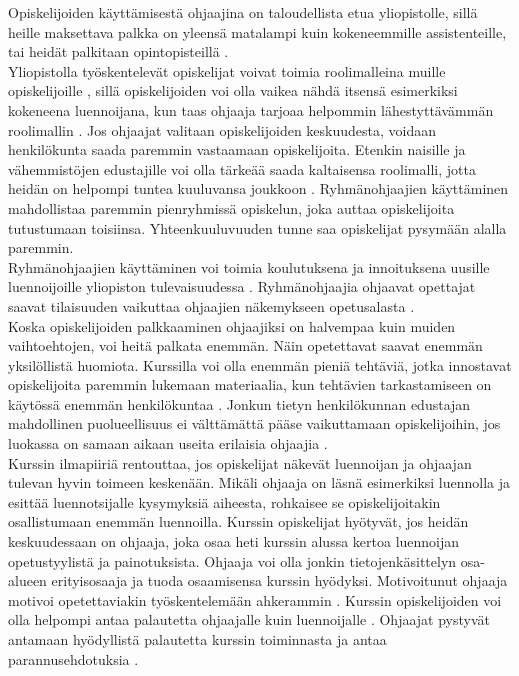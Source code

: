 \documentclass[finnish]{tktltiki2}
\theoremstyle{definition}
\theoremstyle{remark}
\begin{document}
Opiskelijoiden käyttämisestä ohjaajina on taloudellista etua yliopistolle, sillä heille maksettava palkka on yleensä matalampi kuin kokeneemmille assistenteille, tai heidät palkitaan opintopisteillä \cite{Reges88}.
\\
Yliopistolla työskentelevät opiskelijat voivat toimia roolimalleina muille opiskelijoille \cite{Roberts95, Tashakkori05}, sillä opiskelijoiden voi olla vaikea nähdä itsensä esimerkiksi kokeneena luennoijana, kun taas ohjaaja tarjoaa helpommin lähestyttävämmän roolimallin \cite{Roberts02}. Jos ohjaajat valitaan opiskelijoiden keskuudesta, voidaan henkilökunta saada paremmin vastaamaan opiskelijoita. Etenkin naisille ja vähemmistöjen edustajille voi olla tärkeää saada kaltaisensa roolimalli, jotta heidän on helpompi tuntea kuuluvansa joukkoon \cite{Morgan02}. Ryhmänohjaajien käyttäminen mahdollistaa paremmin pienryhmissä opiskelun, joka auttaa opiskelijoita tutustumaan toisiinsa. Yhteenkuuluvuuden tunne saa opiskelijat pysymään alalla paremmin.
\\
Ryhmänohjaajien käyttäminen voi toimia koulutuksena ja innoituksena uusille luennoijoille yliopiston tulevaisuudessa \cite{Roberts95, Morgan02}. Ryhmänohjaajia ohjaavat opettajat saavat tilaisuuden vaikuttaa ohjaajien näkemykseen opetusalasta \cite{Morgan02}.
\\
Koska opiskelijoiden palkkaaminen ohjaajiksi on halvempaa kuin muiden vaihtoehtojen, voi heitä palkata enemmän. Näin opetettavat saavat enemmän yksilöllistä huomiota. Kurssilla voi olla enemmän pieniä tehtäviä, jotka innostavat opiskelijoita paremmin lukemaan materiaalia, kun tehtävien tarkastamiseen on käytössä enemmän henkilökuntaa \cite{Dickson11}. Jonkun tietyn henkilökunnan edustajan mahdollinen puolueellisuus ei välttämättä pääse vaikuttamaan opiskelijoihin, jos luokassa on samaan aikaan useita erilaisia ohjaajia \cite{Morgan02}.
\\
Kurssin ilmapiiriä rentouttaa, jos opiskelijat näkevät luennoijan ja ohjaajan tulevan hyvin toimeen keskenään. Mikäli ohjaaja on läsnä esimerkiksi luennolla ja esittää luennotsijalle kysymyksiä aiheesta, rohkaisee se opiskelijoitakin osallistumaan enemmän luennoilla. Kurssin opiskelijat hyötyvät, jos heidän keskuudessaan on ohjaaja, joka osaa heti kurssin alussa kertoa luennoijan opetustyylistä ja painotuksista. Ohjaaja voi olla jonkin tietojenkäsittelyn osa-alueen erityisosaaja ja tuoda osaamisensa kurssin hyödyksi. Motivoitunut ohjaaja motivoi opetettaviakin työskentelemään ahkerammin \cite{Dickson11}. Kurssin opiskelijoiden voi olla helpompi antaa palautetta ohjaajalle kuin luennoijalle \cite{Morgan02}. Ohjaajat pystyvät antamaan hyödyllistä palautetta kurssin toiminnasta ja antaa parannusehdotuksia \cite{Decker06}.
\end{document}

